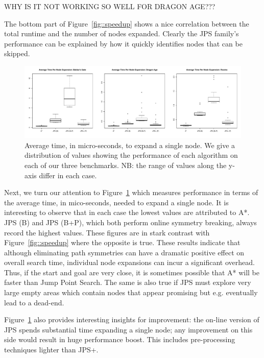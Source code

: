 WHY IS IT NOT WORKING SO WELL FOR DRAGON AGE???  

The bottom part of Figure~\ref{fig::speedup} shows a nice correlation 
between the total runtime and the number of nodes expanded.  
Clearly the JPS family's performance 
can be explained by how it quickly identifies 
nodes that can be skipped.  

\begin{figure}[tb]
       \begin{center}
		   \includegraphics[width=0.95\columnwidth, trim = 0mm 0mm 0mm 0mm]
			{diagrams/avg_time_per_node.pdf}
       \end{center}
\caption{Average time, in micro-seconds, to expand a single node. We give a distribution of values showing the performance of each algorithm
on each of our three benchmarks. NB: the range of values along the y-axis differ in each case.}
\label{fig::expansion_time}
\end{figure}

Next, we turn our attention to Figure~\ref{fig::expansion_time} which measures
performance in terms of the average time, in mico-seconds, needed to expand a single node.
It is interesting to observe that in each case the lowest values are attributed to A*. 
JPS (B) and JPS (B+P), which both perform online symmetry breaking, always record
the highest values. These figures are in stark contrast with Figure~\ref{fig::speedup} where
the opposite is true. These results indicate that although eliminating path symmetries can have
a dramatic positive effect on overall search time, individual node expansions can incur a 
significant overhead. Thus, if the start and goal are very close, it is sometimes possible that
A* will be faster than Jump Point Search. The same is also true if JPS must explore very large
empty areas which contain nodes that appear promising but e.g. eventually lead to a dead-end.

Figure~\ref{fig::expansion_time} also provides 
interesting insights for improvement: 
the on-line version of JPS spends substantial time expanding a single node; 
any improvement on this side would result 
in huge performance boost.  
This includes pre-processing techniques lighter 
than JPS+.  

